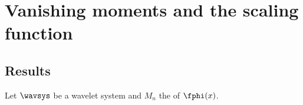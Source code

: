 \section {Vanishing moments and the scaling function}
\subsection{Results}
\begin{lemma} %
\label{lem:vanish_hphi}
Let $\wavsys$ be a wavelet system and $M_n$ the   of $\fphi(x)$.
\end{lemma}
